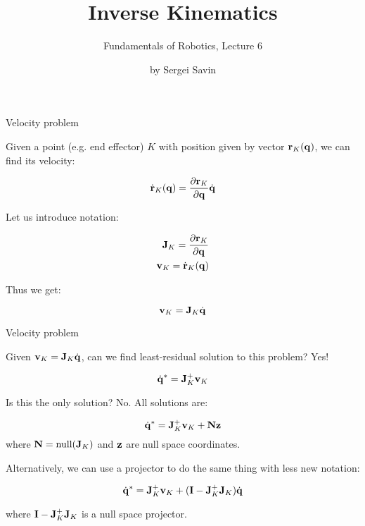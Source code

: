 \documentclass{beamer}
\title{Inverse Kinematics}
\subtitle{Fundamentals of Robotics, Lecture 6}
\author{by Sergei Savin}
\date{\mydate}
\begin{document}
\maketitle





\begin{frame}{Velocity problem}
	\begin{flushleft}
		
		Given a point (e.g. end effector) $K$ with position given by vector $\mathbf{r}_K(\mathbf{q})$, we can find its velocity:
		
		\begin{equation}
			\dot{\mathbf{r}}_K(\mathbf{q}) = \frac{\partial \mathbf{r}_K}{\partial  \mathbf{q}} \dot{\mathbf{q}}
		\end{equation}
		
		Let us introduce notation:
		
		\begin{align}
			\mathbf{J}_K = \frac{\partial \mathbf{r}_K}{\partial  \mathbf{q}} \\
			\mathbf{v}_K = \dot{\mathbf{r}}_K(\mathbf{q})
		\end{align}
	
		Thus we get:
		
		\begin{equation}
			\mathbf{v}_K = \mathbf{J}_K \dot{\mathbf{q}}
		\end{equation}		
		
	\end{flushleft}
\end{frame}




\begin{frame}{Velocity problem}
	\begin{flushleft}
		
		Given $\mathbf{v}_K = \mathbf{J}_K \dot{\mathbf{q}}$, can we find least-residual solution to this problem? Yes!
		
		\begin{equation}
			\dot{\mathbf{q}}^* = \mathbf{J}_K^+ \mathbf{v}_K
		\end{equation}		
	
		Is this the only solution? No. All solutions are:
	
		\begin{equation}
			\dot{\mathbf{q}}^* = \mathbf{J}_K^+ \mathbf{v}_K + \mathbf{N} \mathbf{z}
		\end{equation}			
	where $ \mathbf{N} = \text{null}(\mathbf{J}_K)$ and $\mathbf{z}$ are null space coordinates.
	
	Alternatively, we can use a projector to do the same thing with less new notation:
	
		\begin{equation}
			\dot{\mathbf{q}}^*= \mathbf{J}_K^+ \mathbf{v}_K + (\mathbf{I} - \mathbf{J}_K^+ \mathbf{J}_K)  \dot{\mathbf{q}}
		\end{equation}		
	
	where $\mathbf{I} - \mathbf{J}_K^+ \mathbf{J}_K$ is a null space projector.
		
	\end{flushleft}
\end{frame}
\end{document}

